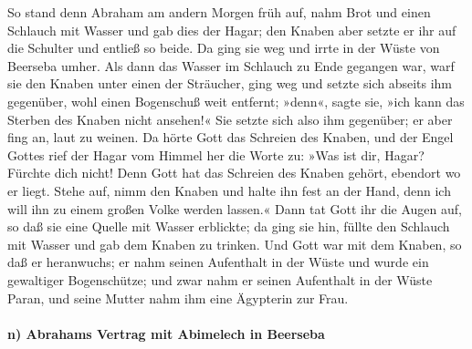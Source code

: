  So stand denn Abraham am andern Morgen früh auf, nahm
Brot und einen Schlauch mit Wasser und gab dies der Hagar; den Knaben
aber setzte er ihr auf die Schulter und entließ so beide. Da ging sie
weg und irrte in der Wüste von Beerseba umher.  Als dann
das Wasser im Schlauch zu Ende gegangen war, warf sie den Knaben unter
einen der Sträucher,  ging weg und setzte sich abseits
ihm gegenüber, wohl einen Bogenschuß weit entfernt; »denn«, sagte sie,
»ich kann das Sterben des Knaben nicht ansehen!« Sie setzte sich also
ihm gegenüber; er aber fing an, laut zu weinen.  Da hörte
Gott das Schreien des Knaben, und der Engel Gottes rief der Hagar vom
Himmel her die Worte zu: »Was ist dir, Hagar? Fürchte dich nicht! Denn
Gott hat das Schreien des Knaben gehört, ebendort wo er liegt.
 Stehe auf, nimm den Knaben und halte ihn fest an der
Hand, denn ich will ihn zu einem großen Volke werden lassen.«
 Dann tat Gott ihr die Augen auf, so daß sie eine Quelle
mit Wasser erblickte; da ging sie hin, füllte den Schlauch mit Wasser
und gab dem Knaben zu trinken.  Und Gott war mit dem
Knaben, so daß er heranwuchs; er nahm seinen Aufenthalt in der Wüste und
wurde ein gewaltiger Bogenschütze;  und zwar nahm er
seinen Aufenthalt in der Wüste Paran, und seine Mutter nahm ihm eine
Ägypterin zur Frau.

\hypertarget{n-abrahams-vertrag-mit-abimelech-in-beerseba}{%
\paragraph{n) Abrahams Vertrag mit Abimelech in
Beerseba}\label{n-abrahams-vertrag-mit-abimelech-in-beerseba}}

